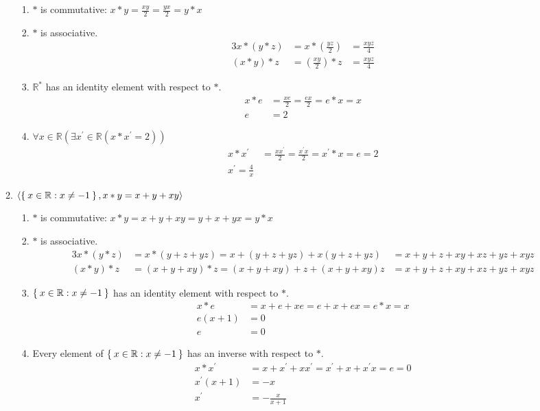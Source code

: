 \begin{enumerate}[label={\Alph*.},font={\bfseries}]
\begin{enumerate}[label={\arabic*},font={\bfseries}]
\begin{enumerate}[label={(\roman*)}]
          \item $*$ is commutative:
            $x*y=\frac{xy}{2} = \frac{yx}{2}=y*x$
          \item $*$ is associative.
            \begin{alignat*}{3}
              x*(y*z) &= x*(\frac{yz}{2}) &= \frac{xyz}{4} \\
              (x*y)*z &= (\frac{xy}{2})*z &= \frac{xyz}{4}
            \end{alignat*}
          \item $\mathbb{R}^*$ has an identity element with respect to $*$.
            \begin{align*}
              x*e &= \frac{xe}{2} = \frac{ex}{2}=e*x = x \\
              e &= 2
            \end{align*}
          \item $\forall x\in\mathbb{R}(\exists x^\prime\in\mathbb{R}(x*x^\prime=2))$
            \begin{align*}
              x*x^\prime &= \frac{xx^\prime}{2} = \frac{x^{\prime}x}{2} = x^{\prime}*x = e = 2 \\
              x^\prime = \frac{4}{x}
            \end{align*}
        \end{enumerate}
      \item $\langle\Set{x\in\mathbb{R} : x \neq -1}, x*y=x+y+xy\rangle$
        \begin{enumerate}[label={(\roman*)}]
          \item $*$ is commutative: $x*y=x+y+xy = y+x+yx=y*x$
          \item $*$ is associative.
            \begin{alignat*}{3}
              x*(y*z) &= x*(y+z+yz) = x+(y+z+yz)+x(y+z+yz) &= x+y+z+xy+xz+yz+xyz \\
              (x*y)*z &= (x+y+xy)*z = (x+y+xy)+z+(x+y+xy)z &= x+y+z+xy+xz+yz+xyz
            \end{alignat*}
          \item $\Set{x\in\mathbb{R} : x \neq -1}$ has an identity element with respect to $*$.
            \begin{align*}
              x*e &= x+e+xe = e+x+ex = e*x = x \\
              e(x+1) &= 0 \\
              e &= 0
            \end{align*}
          \item Every element of $\Set{x\in\mathbb{R} : x \neq -1}$ has an inverse with respect to $*$.
            \begin{align*}
              x*x^\prime &= x+x^\prime+xx^\prime=x^\prime+x+x^{\prime}x = e = 0 \\
              x^{\prime}(x+1) &= -x \\
              x^\prime &= -\frac{x}{x+1}
            \end{align*}
        \end{enumerate}
    \end{enumerate}
\end{enumerate}
